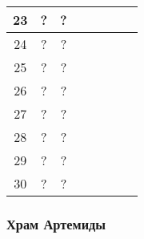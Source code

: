 \begin{longtable}[c]{|c|c|c|c|c|c|c|c|}
    \multirow{1}{*}{23} & \multirow{1}{*}{?} & \multirow{1}{*}{?} & & & & & \\\hline
    \multirow{1}{*}{24} & \multirow{1}{*}{?} & \multirow{1}{*}{?} & & & & & \\\hline
    \multirow{1}{*}{25} & \multirow{1}{*}{?} & \multirow{1}{*}{?} & & & & & \\\hline
    \multirow{1}{*}{26} & \multirow{1}{*}{?} & \multirow{1}{*}{?} & & & & & \\\hline
    \multirow{1}{*}{27} & \multirow{1}{*}{?} & \multirow{1}{*}{?} & & & & & \\\hline
    \multirow{1}{*}{28} & \multirow{1}{*}{?} & \multirow{1}{*}{?} & & & & & \\\hline
    \multirow{1}{*}{29} & \multirow{1}{*}{?} & \multirow{1}{*}{?} & & & & & \\\hline
    \multirow{1}{*}{30} & \multirow{1}{*}{?} & \multirow{1}{*}{?} & & & & & \\\hline
\end{longtable}


\subsubsection{Храм Артемиды}


